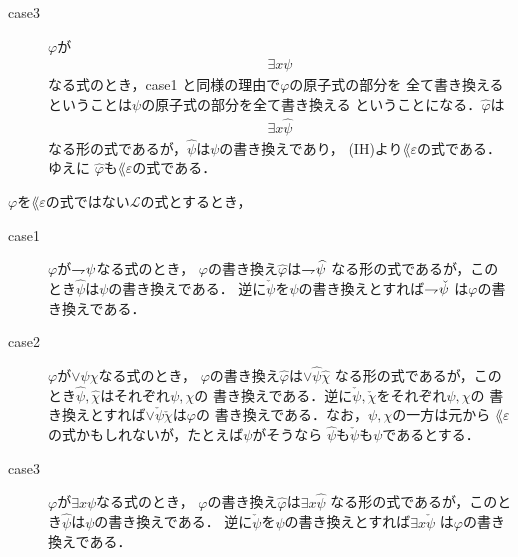 \begin{metaprf}
\begin{description}
\begin{description}
					\item[case3] $\varphi$が
						\begin{align}
							\exists x \psi
						\end{align}
						なる式のとき，case1 と同様の理由で$\varphi$の原子式の部分を
						全て書き換えるということは$\psi$の原子式の部分を全て書き換える
						ということになる．$\widehat{\varphi}$は
						\begin{align}
							\exists x \widehat{\psi}
						\end{align}
						なる形の式であるが，$\widehat{\psi}$は$\psi$の書き換えであり，
						(IH)より$\lang{\varepsilon}$の式である．ゆえに
						$\widehat{\varphi}$も$\lang{\varepsilon}$の式である．
						\QED
				\end{description}
		\end{description}
	\end{metaprf}
	
	\begin{screen}
		\begin{metathm}[部分式の書き換えとの関係]
		\label{metathm:relation_to_subformula_rewriting}
			$\varphi$を$\lang{\varepsilon}$の式ではない$\mathcal{L}$の式とするとき，
			\begin{description}
				\item[case1] $\varphi$が$\rightharpoondown\hspace{-0.25em} \psi$なる式のとき，
					$\varphi$の書き換え$\widehat{\varphi}$は$\rightharpoondown\hspace{-0.25em} \widehat{\psi}$
					なる形の式であるが，このとき$\widehat{\psi}$は$\psi$の書き換えである．
					逆に$\check{\psi}$を$\psi$の書き換えとすれば$\rightharpoondown\hspace{-0.25em} \check{\psi}$
					は$\varphi$の書き換えである．
					
				\item[case2] $\varphi$が$\vee \psi \chi$なる式のとき，
					$\varphi$の書き換え$\widehat{\varphi}$は$\vee \widehat{\psi} \widehat{\chi}$
					なる形の式であるが，このとき$\widehat{\psi},\widehat{\chi}$はそれぞれ$\psi,\chi$の
					書き換えである．逆に$\check{\psi},\check{\chi}$をそれぞれ$\psi,\chi$の
					書き換えとすれば$\vee \check{\psi} \check{\chi}$は$\varphi$の
					書き換えである．なお，$\psi,\chi$の一方は元から
					$\lang{\varepsilon}$の式かもしれないが，たとえば$\psi$がそうなら
					$\widehat{\psi}$も$\check{\psi}$も$\psi$であるとする．
					
				\item[case3] $\varphi$が$\exists x \psi$なる式のとき，
					$\varphi$の書き換え$\widehat{\varphi}$は$\exists x \widehat{\psi}$
					なる形の式であるが，このとき$\widehat{\psi}$は$\psi$の書き換えである．
					逆に$\check{\psi}$を$\psi$の書き換えとすれば$\exists x \check{\psi}$
					は$\varphi$の書き換えである．
			\end{description}
		\end{metathm}
	\end{screen}
	
